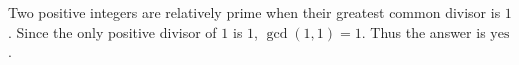 Two positive integers are relatively prime when their greatest common divisor is $1$. Since the only positive divisor of $1$ is $1$, $\gcd(1,1)=1$. Thus the answer is $\boxed{\text{yes}}$.
